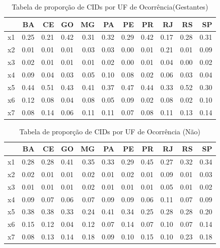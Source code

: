 \documentclass[
]{article}
\begin{document}
\begin{table}

\caption{\label{tab:unnamed-chunk-13}Tabela de proporção de CIDs por UF de Ocorrência(Gestantes)}
\centering
\begin{tabular}[t]{l|r|r|r|r|r|r|r|r|r|r}
\hline
  & BA & CE & GO & MG & PA & PE & PR & RJ & RS & SP\\
\hline
x1 & 0.25 & 0.21 & 0.42 & 0.31 & 0.32 & 0.29 & 0.42 & 0.17 & 0.28 & 0.31\\
\hline
x2 & 0.01 & 0.01 & 0.01 & 0.03 & 0.03 & 0.00 & 0.01 & 0.21 & 0.01 & 0.09\\
\hline
x3 & 0.02 & 0.01 & 0.01 & 0.01 & 0.02 & 0.00 & 0.01 & 0.04 & 0.00 & 0.02\\
\hline
x4 & 0.09 & 0.04 & 0.03 & 0.05 & 0.10 & 0.08 & 0.02 & 0.06 & 0.03 & 0.04\\
\hline
x5 & 0.44 & 0.51 & 0.43 & 0.41 & 0.37 & 0.47 & 0.44 & 0.33 & 0.52 & 0.30\\
\hline
x6 & 0.12 & 0.08 & 0.04 & 0.08 & 0.05 & 0.09 & 0.02 & 0.08 & 0.02 & 0.10\\
\hline
x7 & 0.08 & 0.14 & 0.06 & 0.11 & 0.11 & 0.07 & 0.08 & 0.11 & 0.13 & 0.14\\
\hline
\end{tabular}
\end{table}

\begin{table}

\caption{\label{tab:unnamed-chunk-13}Tabela de proporção de CIDs por UF de Ocorrência  (Não)}
\centering
\begin{tabular}[t]{l|r|r|r|r|r|r|r|r|r|r}
\hline
  & BA & CE & GO & MG & PA & PE & PR & RJ & RS & SP\\
\hline
x1 & 0.28 & 0.28 & 0.41 & 0.35 & 0.33 & 0.29 & 0.45 & 0.27 & 0.32 & 0.34\\
\hline
x2 & 0.02 & 0.01 & 0.01 & 0.02 & 0.01 & 0.02 & 0.01 & 0.09 & 0.01 & 0.03\\
\hline
x3 & 0.01 & 0.01 & 0.01 & 0.02 & 0.01 & 0.01 & 0.01 & 0.05 & 0.01 & 0.02\\
\hline
x4 & 0.09 & 0.07 & 0.06 & 0.07 & 0.09 & 0.09 & 0.06 & 0.11 & 0.07 & 0.09\\
\hline
x5 & 0.38 & 0.38 & 0.33 & 0.24 & 0.41 & 0.34 & 0.25 & 0.28 & 0.28 & 0.20\\
\hline
x6 & 0.15 & 0.12 & 0.04 & 0.12 & 0.07 & 0.14 & 0.07 & 0.10 & 0.07 & 0.14\\
\hline
x7 & 0.08 & 0.13 & 0.14 & 0.18 & 0.09 & 0.10 & 0.15 & 0.10 & 0.23 & 0.18\\
\hline
\end{tabular}
\end{table}
\end{document}
